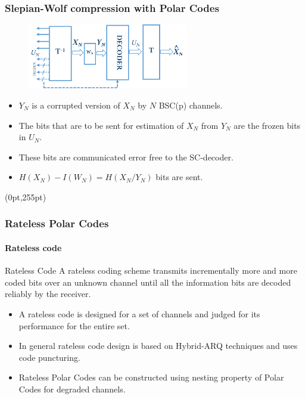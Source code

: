 \documentclass[xcolor=dvipsnames]{beamer}
\newcommand\hypercorner[1]{%
  \begin{textblock*}{\paperwidth}(0pt,255pt)
    \raggedleft #1\hspace{.5em}
  \end{textblock*}}
\begin{document}
\begin{frame}[label = polarslepian]
\frametitle{Slepian-Wolf compression with Polar Codes}
\begin{figure}
\centering
\includegraphics[width=7cm]{./pswschemep.png}
\end{figure}
\begin{itemize}
\item $Y_N$ is a corrupted version of $X_N$ by $N$ BSC(p) channels.
\item The bits that are to be sent for estimation of $X_N$ from $Y_N$ are the frozen bits in $U_N$.  
\item These bits are communicated error free to the SC-decoder. 
\item $H(X_N)-I(W_N)=H(X_N/Y_N)$ bits are sent. 
\end{itemize}
\hypercorner{ \hyperlink{polarswperformance}{\beamerbutton{Performance}}}
\end{frame}
\begin{frame}[label = rpc]
\frametitle{Rateless Polar Codes}
\framesubtitle{Rateless code}
\begin{block}{Rateless Code}
A rateless coding scheme transmits incrementally more and more coded bits over an unknown channel until all the information bits are decoded reliably by the receiver.
\end{block}
\begin{itemize}
\item A rateless code is designed for a set of channels and judged for its performance for the entire set.
\item In general rateless code design is based on Hybrid-ARQ techniques and uses code puncturing.
\item Rateless Polar Codes can be constructed using nesting property of Polar Codes for degraded channels.
\end{itemize}
\end{frame}
\end{document}
